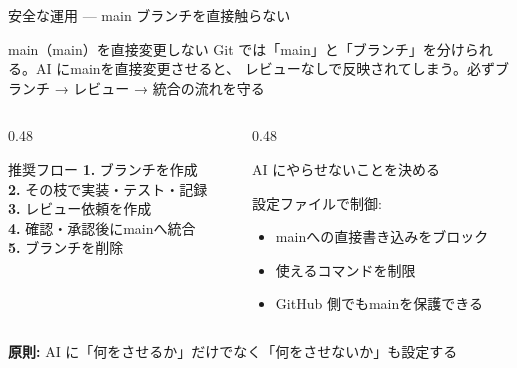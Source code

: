 \documentclass[aspectratio=169, 14pt]{beamer}
\begin{document}
\begin{frame}{安全な運用 — main ブランチを直接触らない}
  \begin{alertblock}{main（main）を直接変更しない}
    {\small Git では「main」と「ブランチ」を分けられる。AI にmainを直接変更させると、
    レビューなしで反映されてしまう。必ずブランチ → レビュー → 統合の流れを守る}
  \end{alertblock}

  \vspace{0.2em}

  \begin{columns}[T]
    \begin{column}{0.48\textwidth}
      \begin{block}{推奨フロー}
        {\scriptsize
        \textbf{1.} ブランチを作成 \\
        \textbf{2.} その枝で実装・テスト・記録 \\
        \textbf{3.} レビュー依頼を作成 \\
        \textbf{4.} 確認・承認後にmainへ統合 \\
        \textbf{5.} ブランチを削除
        }
      \end{block}
    \end{column}
    \begin{column}{0.48\textwidth}
      \begin{block}{AI にやらせないことを決める}
        {\scriptsize
        設定ファイルで制御:
        \begin{itemize}
          \item mainへの直接書き込みをブロック
          \item 使えるコマンドを制限
          \item GitHub 側でもmainを保護できる
        \end{itemize}
        }
      \end{block}
    \end{column}
  \end{columns}

  \vspace{0.2em}

  {\footnotesize \textbf{原則:} AI に「何をさせるか」だけでなく「何をさせないか」も設定する}
\end{frame}

\end{document}
